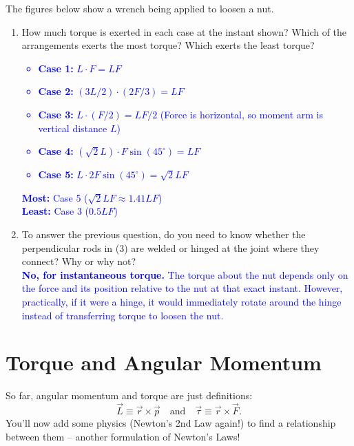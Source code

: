 \documentclass[11pt, letterpaper, openany]{book}
\newenvironment{exercise}[1][Exercise]{%
  \tcolorbox[blanker, breakable, left=1em,
    before skip=1em, after skip=1em,
    borderline west={3pt}{0pt}{PhysNavy},
    colback=PhysCream,
    before upper={\textcolor{PhysNavy}{\sffamily\bfseries #1:}\space}
  ]%
}{%
  \endtcolorbox%
}
\begin{document}
\begin{exercise}[Exercise 6]
The figures below show a wrench being applied to loosen a nut.
\begin{enumerate}
    \item How much torque is exerted in each case at the instant shown? Which of the arrangements exerts the most torque? Which exerts the least torque?
    \textcolor{blue}{
    \begin{itemize}
        \item \textbf{Case 1:} $L \cdot F = LF$
        \item \textbf{Case 2:} $(3L/2) \cdot (2F/3) = LF$
        \item \textbf{Case 3:} $L \cdot (F/2) = LF/2$ (Force is horizontal, so moment arm is vertical distance $L$)
        \item \textbf{Case 4:} $(\sqrt{2}L) \cdot F\sin(45^\circ) = LF$
        \item \textbf{Case 5:} $L \cdot 2F\sin(45^\circ) = \sqrt{2}LF$
    \end{itemize}
    \textbf{Most:} Case 5 ($\sqrt{2}LF \approx 1.41 LF$) \\
    \textbf{Least:} Case 3 ($0.5 LF$)
    }
    
    \item To answer the previous question, do you need to know whether the perpendicular rods in (3) are welded or hinged at the joint where they connect? Why or why not? \\
    \textcolor{blue}{\textbf{No, for instantaneous torque.} The torque about the nut depends only on the force and its position relative to the nut at that exact instant. However, practically, if it were a hinge, it would immediately rotate around the hinge instead of transferring torque to loosen the nut.}
\end{enumerate}
\end{exercise}

\section*{Torque and Angular Momentum}

So far, angular momentum and torque are just definitions:
\[ \vec{L} \equiv \vec{r} \times \vec{p} \quad \text{and} \quad \vec{\tau} \equiv \vec{r} \times \vec{F}. \]
You'll now add some physics (Newton's 2nd Law again!) to find a relationship between them -- another formulation of Newton's Laws!
\end{document}
